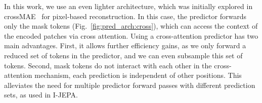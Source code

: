 In this work, we use an even lighter architecture, which was initially explored in crossMAE~\citep{crossmae} for pixel-based reconstruction.
In this case, the predictor forwards only the mask tokens (Fig.~\ref{fig:pred_arch:cross}), which can access the context of the encoded patches via cross attention.
Using a cross-attention predictor has two main advantages. 
First, it allows further efficiency gains, as we only forward a reduced set of tokens in the predictor, and we can even subsample this set of tokens.
Second, mask tokens do not interact with each other in the cross-attention mechanism, \ie each prediction is independent of other positions.
This alleviates the need for multiple predictor forward passes with different prediction sets, as used in I-JEPA.
